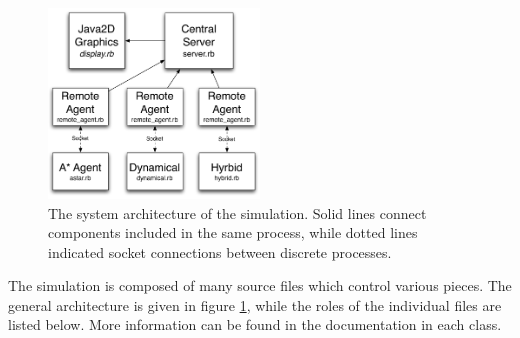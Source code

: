 \documentclass{article}
\begin{document}
\begin{figure}[h]
  \begin{center}
    \includegraphics[width=0.5\textwidth]{architecture}
  \end{center}
  \caption{The system architecture of the simulation. Solid lines connect
    components included in the same process, while dotted lines indicated socket
    connections between discrete processes.}
  \label{architecture}
\end{figure}

The simulation is composed of many source files which control various
pieces. The general architecture is given in figure
\ref{architecture}, while the roles of the individual files are listed
below. More information can be found in the documentation in each class.
\end{document}
